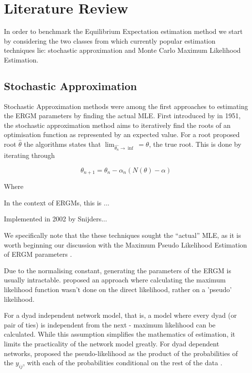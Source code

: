 \section{Literature Review}  

In order to benchmark the Equilibrium Expectation estimation method we start by considering the two classes from which currently popular estimation techniques lie: stochastic approximation and Monte Carlo Maximum Likelihood Estimation.

\subsection{Stochastic Approximation}

Stochastic Approximation methods were among the first approaches to estimating the ERGM parameters by finding the actual MLE. First introduced by \citeauthor{robbinsmonro1951} in 1951, the stochastic approximation method aims to iteratively find the roots of an optimisation function as represented by an expected value. For a root proposed root $\hat{\theta}$ the \citeauthor{robbinsmonro1951} algorithms states that $\lim_{\hat{\theta_n} \rightarrow \inf} = \theta$, the true root. This is done by iterating through 

\begin{equation}
\label{eqn:rm_update}
\theta_{n+1} = \theta_{n} - \alpha_n(N(\theta) - \alpha)
\end{equation}

Where 


In the context of ERGMs, this is ...

Implemented in 2002 by Snijders...


We specifically note that the these techniques sought the ``actual'' MLE, as it is worth beginning our discussion with the Maximum Pseudo Likelihood Estimation of ERGM parameters \citet{straussikeda1990}.


Due to the normalising constant, generating the parameters of the ERGM is usually intractable. \citeauthor{straussikeda1990} proposed an approach where calculating the maximum likelihood function wasn't done on the direct likelihood, rather on a 'pseudo' likelihood.

For a dyad independent network model, that is, a model where every dyad (or pair of ties) is independent from the next - maximum likelihood can be calculated. While this assumption simplifies the mathematics of estimation, it limits the practicality of the network model greatly. For dyad dependent networks, \citeauthor{straussikeda1990} proposed the pseudo-likelihood as the product of the probabilities of the $y_{ij}$, with each of the probabilities conditional on the rest of the data \citet{straussikeda1990}.

